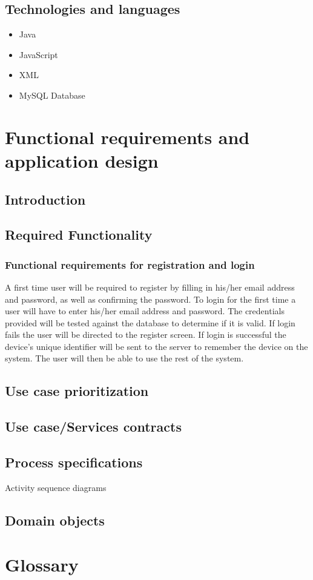 \documentclass[10pt,a4paper]{article}
\begin{document}
\subsection{Technologies and languages}
\begin{itemize}
\item Java
\item JavaScript
\item XML
\item MySQL Database
\end{itemize}
\section{Functional requirements and application design}
\subsection{Introduction}
\subsection{Required Functionality}
\subsubsection{Functional requirements for registration and login}
A first time user will be required to register by filling in his/her email address and password, as well as confirming the password.
To login for the first time a user will have to enter his/her email address and password. The credentials provided will be tested against the database to determine if it is valid. If login fails the user will be directed to the register screen. If login is successful the device's unique identifier will be sent to the server to remember the device on the system. The user will then be able to use the rest of the system.

\subsection{Use case prioritization}
\subsection{Use case/Services contracts}
\subsection{Process specifications}
Activity sequence diagrams
\subsection{Domain objects}
\section{Glossary}
\end{document}
